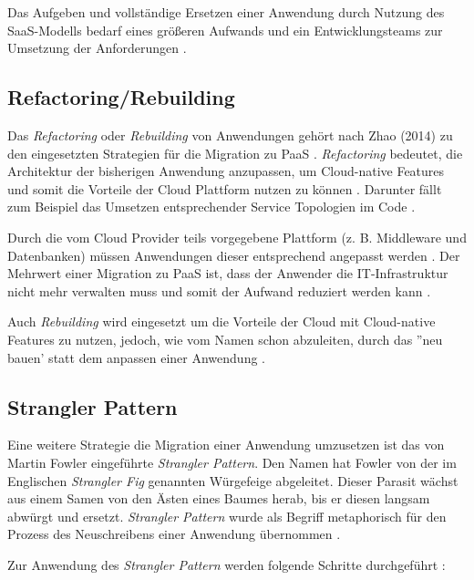 Das Aufgeben und vollständige Ersetzen einer Anwendung durch Nutzung des \ac{SaaS}-Modells bedarf eines größeren Aufwands und ein Entwicklungsteams zur Umsetzung der Anforderungen \cite[Vgl.][]{CIO}. \pagebreak

\subsection{Refactoring/Rebuilding}
Das \textit{Refactoring} oder \textit{Rebuilding} von Anwendungen gehört nach Zhao (2014) zu den eingesetzten Strategien für die Migration zu \ac{PaaS} \cite[Vgl.][S. 144]{Zhao2014}. \textit{Refactoring} bedeutet, die Architektur der bisherigen Anwendung anzupassen, um Cloud-native Features \cite[Vgl.][S. 2]{Ahmad2018} und somit die Vorteile der Cloud Plattform nutzen zu können \cite[Vgl.][]{CIO}. Darunter fällt zum Beispiel das Umsetzen entsprechender Service Topologien im Code \cite[Vgl.][S. 2]{Holmes2018}.

Durch die vom Cloud Provider teils vorgegebene Plattform (z. B. Middleware und Datenbanken) müssen Anwendungen dieser entsprechend angepasst werden \cite[Vgl.][S. 227]{Surianarayanan2019}. Der Mehrwert einer Migration zu \ac{PaaS} ist, dass der Anwender die IT-Infrastruktur nicht mehr verwalten muss und somit der Aufwand reduziert werden kann \cite[Vgl.][S. 6]{Pahl}.

Auch \textit{Rebuilding} wird eingesetzt um die Vorteile der Cloud mit Cloud-native Features zu nutzen, jedoch, wie vom Namen schon abzuleiten, durch das ''neu bauen' statt dem anpassen einer Anwendung \cite[Vgl.][S. 2]{Ahmad2018}.

\subsection{Strangler Pattern}
Eine weitere Strategie die Migration einer Anwendung umzusetzen ist das von Martin Fowler eingeführte \textit{Strangler Pattern}. Den Namen hat Fowler von der im Englischen \textit{Strangler Fig} genannten Würgefeige abgeleitet. Dieser Parasit wächst aus einem Samen von den Ästen eines Baumes herab, bis er diesen langsam abwürgt und ersetzt. \textit{Strangler Pattern} wurde als Begriff metaphorisch für den Prozess des Neuschreibens einer Anwendung übernommen \cite[Vgl.][]{Fowler2004}\cite[Vgl.][]{Ibryam2021}.

Zur Anwendung des \textit{Strangler Pattern} werden folgende Schritte durchgeführt \cite[Vgl. auch im Folgenden][]{Ibryam2021}:

